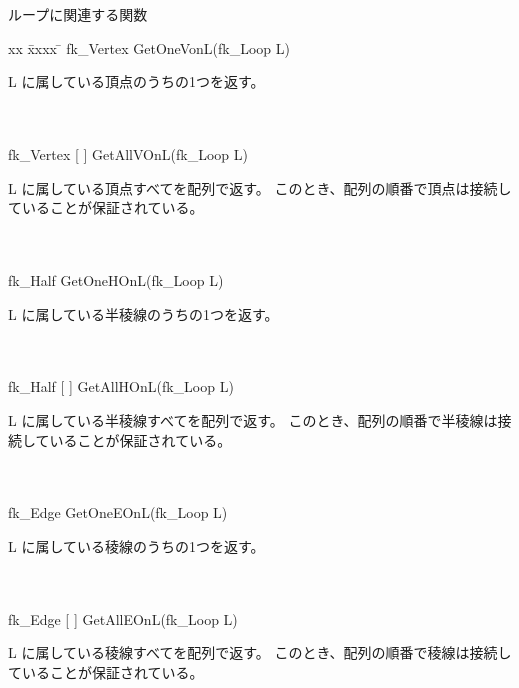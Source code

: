 \begin{center}
{\large ループに関連する関数}
\end{center}
\begin{tabbing}
xx \= xxxx \= \kill
 \> fk\_Vertex GetOneVonL(fk\_Loop L) \\
	\> \> \begin{minipage}[]{15cm}
		L に属している頂点のうちの1つを返す。
	\end{minipage} \\ \\

 \> fk\_Vertex [ ] GetAllVOnL(fk\_Loop L) \\
	\> \> \begin{minipage}[]{15cm}
		L に属している頂点すべてを配列で返す。
		このとき、配列の順番で頂点は接続していることが保証されている。
	\end{minipage} \\ \\

 \> fk\_Half GetOneHOnL(fk\_Loop L) \\
	\> \> \begin{minipage}[]{15cm}
		L に属している半稜線のうちの1つを返す。
	\end{minipage} \\ \\

 \> fk\_Half [ ] GetAllHOnL(fk\_Loop L) \\
	\> \> \begin{minipage}[]{15cm}
		L に属している半稜線すべてを配列で返す。
		このとき、配列の順番で半稜線は接続していることが保証されている。
	\end{minipage} \\ \\

 \> fk\_Edge GetOneEOnL(fk\_Loop L) \\
	\> \> \begin{minipage}[]{15cm}
		L に属している稜線のうちの1つを返す。
	\end{minipage} \\ \\

 \> fk\_Edge [ ] GetAllEOnL(fk\_Loop L) \\
	\> \> \begin{minipage}[]{15cm}
		L に属している稜線すべてを配列で返す。
		このとき、配列の順番で稜線は接続していることが保証されている。
	\end{minipage} \\ \\


\end{tabbing}
